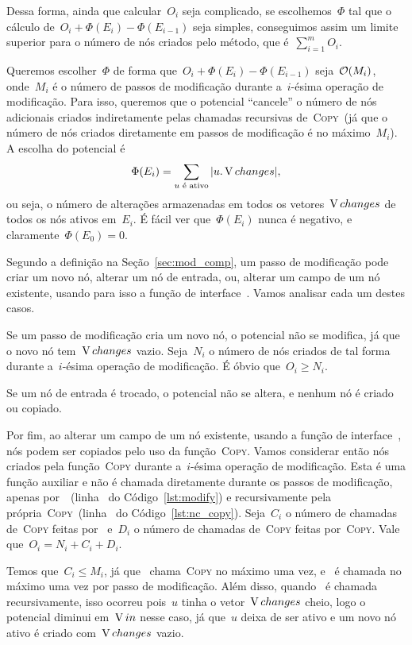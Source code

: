 \documentclass[main.tex]{subfiles}
\begin{document}
Dessa forma, ainda que calcular~$O_i$ seja complicado, se escolhemos~$\Phi$ tal que o cálculo de~${O_i + \Phi(E_i) - \Phi(E_{i-1})}$ seja simples, conseguimos assim um limite superior para o número de nós criados pelo método, que é~$\sum\limits_{i=1}^m{O_i}$.

Queremos escolher~$\Phi$ de forma que~${O_i + \Phi(E_i) - \Phi(E_{i-1})}$ seja~$\mathcal{O}(M_i)$, onde~$M_i$ é o número de passos de modificação durante a~$i$-ésima operação de modificação. Para isso, queremos que o potencial ``cancele'' o número de nós adicionais criados indiretamente pelas chamadas recursivas de~\textsc{Copy}~(já que o número de nós criados diretamente em passos de modificação é no máximo~$M_i$). A escolha do potencial é~$$\Phi(E_i) = \sum\limits_{u \text{ é ativo}}{|u.\operatorname{V}{changes}|},$$ ou seja, o número de alterações armazenadas em todos os vetores~$\operatorname{V}{changes}$ de todos os nós ativos em~$E_i$. É fácil ver que~$\Phi(E_i)$ nunca é negativo, e claramente~$\Phi(E_0) = 0$.

Segundo a definição na Seção~\ref{sec:mod_comp}, um passo de modificação pode criar um novo nó, alterar um nó de entrada, ou, alterar um campo de um nó existente, usando para isso a função de interface~. Vamos analisar cada um destes casos.

Se um passo de modificação cria um novo nó, o potencial não se modifica, já que o novo nó tem~$\operatorname{V}{changes}$ vazio. Seja~$N_i$ o número de nós criados de tal forma durante a~$i$-ésima operação de modificação. É óbvio que~$O_i \geq N_i$.

Se um nó de entrada é trocado, o potencial não se altera, e nenhum nó é criado ou copiado.

Por fim, ao alterar um campo de um nó existente, usando a função de interface~, nós podem ser copiados pelo uso da função~\textsc{Copy}.
Vamos considerar então nós criados pela função~\textsc{Copy} durante a~$i$-ésima operação de modificação. Esta é uma função auxiliar e não é chamada diretamente durante os passos de modificação, apenas por~~(linha~ do Código~\ref{lst:modify}) e recursivamente pela própria~\textsc{Copy}~(linha~ do Código~\ref{lst:nc_copy}). Seja~$C_i$ o número de chamadas de~\textsc{Copy} feitas por~ e~$D_i$ o número de chamadas de~\textsc{Copy} feitas por~\textsc{Copy}. Vale que~$O_i = N_i + C_i + D_i$.

Temos que~$C_i \leq M_i$, já que~ chama~\textsc{Copy} no máximo uma vez, e~ é chamada no máximo uma vez por passo de modificação. Além disso, quando~ é chamada recursivamente, isso ocorreu pois~$u$ tinha o vetor~$\operatorname{V}{changes}$ cheio, logo o potencial diminui em~$\operatorname{V}{in}$ nesse caso, já que~$u$ deixa de ser ativo e um novo nó ativo é criado com~$\operatorname{V}{changes}$ vazio.
\end{document}
